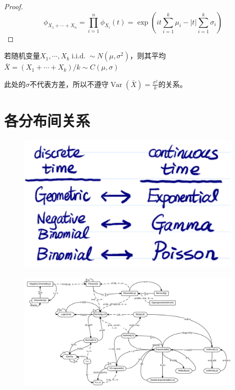 \begin{proof}
    \[ \phi_{X_1+\cdots+ X_n} = \prod_{i=1}^n \phi_{X_i}(t)=\exp (it\sum_{i=1}^k\mu_i - |t|\sum_{i=1}^k \sigma_i) \]
\end{proof}

\begin{corollary}
    若随机变量$X_1,\cdots ,X_k \operatorname{i.i.d.} \sim N(\mu,\sigma^2)$，则其平均$\bar{X}=(X_1+\cdots +X_k)/k \sim C(\mu,\sigma)$
\end{corollary}

\begin{remark}
    此处的$\sigma$不代表方差，所以不遵守$\operatorname{Var}(\bar{X})=\frac{\sigma^2}{k}$的关系。
\end{remark}

\section{各分布间关系}

\begin{figure}[hp]
    \centering\includegraphics[width=0.95\textwidth]{image/relationship.png}
\end{figure}

\begin{figure}[hp]
    \centering\includegraphics[width=0.95\textwidth]{image/Relationships_among_some_of_univariate_probability_distributions.jpg}
\end{figure}